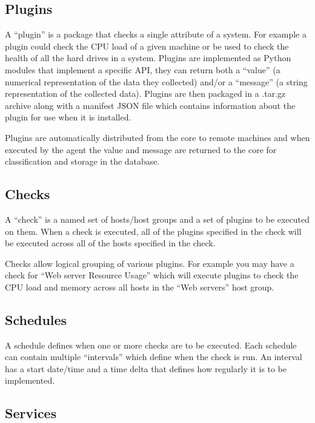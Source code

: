 \documentclass[bsc,deptreport,twoside,parskip,singlespacing,notimes]{infthesis}
\begin{document}
\subsection{Plugins}

	A ``plugin'' is a package that checks a single attribute of a system.  For
	example a plugin could check the CPU load of a given machine or be used to
	check the health of all the hard drives in a system.  Plugins are implemented
	as Python modules that implement a specific API, they can return both a ``value''
	(a numerical representation of the data they collected) and/or a ``message'' (a
	string representation of the collected data).  Plugins are then packaged in a
	.tar.gz archive along with a manifest JSON file which contains information
	about the plugin for use when it is installed.


	Plugins are automatically distributed from the core to remote machines and when
	executed by the agent the value and message are returned to the core for
	classification and storage in the database.

\subsection{Checks}

	A ``check'' is a named set of hosts/host groups and a set of plugins to be
	executed on them.  When a check is executed, all of the plugins specified in
	the check will be executed across all of the hosts specified in the check.


	Checks allow logical grouping of various plugins.  For example you may have a
	check for ``Web server Resource Usage'' which will execute plugins to check the
	CPU load and memory across all hosts in the ``Web servers'' host group.

\subsection{Schedules}
\label{methodology-schedules}

	A schedule defines when one or more checks are to be executed.  Each schedule
	can contain multiple ``intervals'' which define when the check is run.  An
	interval has a start date/time and a time delta that defines how regularly it
	is to be implemented.

\subsection{Services}
\label{methodology-services}
\end{document}
